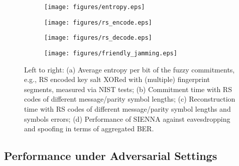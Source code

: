 \begin{figure*}[t]
\begin{subfigure}[t]{0.24\textwidth}
\texttt{[image: figures/entropy.eps]}
\end{subfigure}
\hspace{\fill}
\begin{subfigure}[t]{0.24\textwidth}
\texttt{[image: figures/rs\_encode.eps]}
\end{subfigure}
\hspace{\fill}
\begin{subfigure}[t]{0.24\textwidth}
\texttt{[image: figures/rs\_decode.eps]}
\end{subfigure}
\hspace{\fill}
\begin{subfigure}[t]{0.24\textwidth}
\texttt{[image: figures/friendly\_jamming.eps]}
\end{subfigure}
\caption{Left to right: (a) Average entropy per bit of the fuzzy commitments, e.g., RS encoded key salt XORed with (multiple) fingerprint segments, measured via NIST tests; (b) Commitment time with RS codes of different message/parity symbol lengths; (c) Reconstruction time with RS codes of different message/parity symbol lengths and symbols errors; (d) Performance of SIENNA against eavesdropping and spoofing in terms of aggregated
BER.}
\label{fig:key evolution}
\end{figure*}
\vspace{-10pt}

\subsection{Performance under Adversarial Settings}

